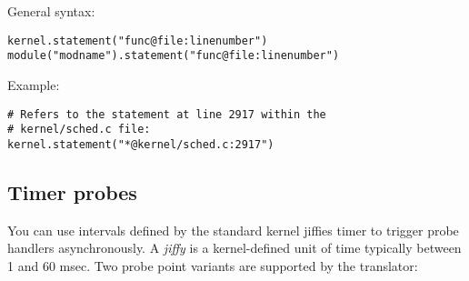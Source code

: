 \documentclass[twoside,english]{article}
\newenvironment{vindent}
{\begin{list}{}{\setlength{\listparindent}{6pt}}
\item[]}
{\end{list}}
\begin{document}
General syntax:

\begin{vindent}
\begin{verbatim}
kernel.statement("func@file:linenumber")
module("modname").statement("func@file:linenumber")
\end{verbatim}
\end{vindent}
Example:

\begin{vindent}
\begin{verbatim}
# Refers to the statement at line 2917 within the
# kernel/sched.c file:
kernel.statement("*@kernel/sched.c:2917")
\end{verbatim}
\end{vindent}

\begin{comment}
\subsection{Marker probes}

This family of probe points connects to static probe markers inserted into
the kernel or a module. These markers are special macro calls in the kernel
that make probing faster and more reliable than with DWARF-based probes.
DWARF debugging information is not required to use probe markers.

Marker probe points begin with a kernel or module(\char`\"{}\emph{name}\char`\"{})
prefix, the same as DWARF probes. This prefix identifies the source of the
symbol table used for finding markers. The suffix names the marker itself:
mark(\char`\"{}\emph{name}\char`\"{}). The marker name string, which may
contain wildcard characters, is matched against the names given to the marker
macros when the kernel or module was compiled.

The handler associated with a marker probe reads any optional parameters
specified at the macro call site named \$arg1 through \$argNN, where NN is
the number of parameters supplied by the macro. Number and string parameters
are passed in a type-safe manner.
\end{comment}

\subsection{Timer probes}
You can use intervals defined by the standard kernel jiffies
timer to trigger probe handlers asynchronously. A \emph{jiffy} is a kernel-defined
unit of time typically between 1 and 60 msec. Two probe point variants are
supported by the translator: 
\end{document}
